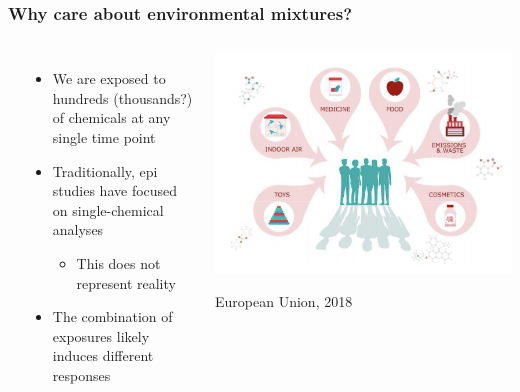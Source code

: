 \frame
{\frametitle{ Why care about environmental mixtures? }
\begin{columns}
\vspace{2ex} \\
    {\begin{itemize}
        \item We are exposed to hundreds (thousands?) of chemicals at any single time point
        \pause
        \item Traditionally, epi studies have focused on single-chemical analyses
        \begin{itemize}
            \item This does not represent reality
        \end{itemize}
        \pause
        \item The {\color{matbluedark} combination} of exposures likely induces different responses 
    \end{itemize}}
\begin{center}
\begin{changemargin}{-1.5em}{-1em}
	\onslide\includegraphics[scale=0.325]{figures/europa_image.png} \\
\end{changemargin}
\vspace{-1em}
\raggedleft
{\tiny\color{hgray}European Union, 2018}
\end{center}
\end{columns}
}


